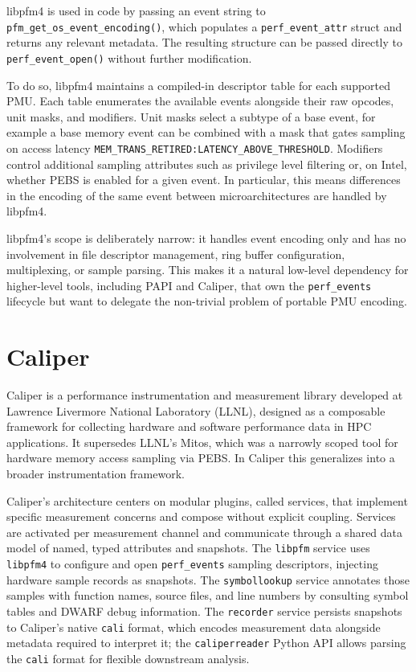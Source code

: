 libpfm4 is used in code by passing an event string to \texttt{pfm\_get\_os\_event\_encoding()}, which populates a \texttt{perf\_event\_attr} struct and returns any relevant metadata. The resulting structure can be passed directly to \texttt{perf\_event\_open()} without further modification.\cite{libpfm4}

To do so, libpfm4 maintains a compiled-in descriptor table for each supported PMU. Each table enumerates the available events alongside their raw opcodes, unit masks, and modifiers. Unit masks select a subtype of a base event, for example a base memory event can be combined with a mask that gates sampling on access latency \texttt{MEM\_TRANS\_RETIRED:LATENCY\_ABOVE\_THRESHOLD}. Modifiers control additional sampling attributes such as privilege level filtering or, on Intel, whether PEBS is enabled for a given event. In particular, this means differences in the encoding of the same event between microarchitectures are handled by libpfm4.\cite{libpfm4}

libpfm4's scope is deliberately narrow: it handles event encoding only and has no involvement in file descriptor management, ring buffer configuration, multiplexing, or sample parsing. This makes it a natural low-level dependency for higher-level tools, including PAPI\cite{PAPI} and Caliper\cite{Boehme2016}, that own the \texttt{perf\_events} lifecycle but want to delegate the non-trivial problem of portable PMU encoding.

\section{Caliper}\label{sec:caliper}
Caliper is a performance instrumentation and measurement library developed at Lawrence Livermore National Laboratory (LLNL)\cite{Boehme2016,CaliperGh}, designed as a composable framework for collecting hardware and software performance data in HPC applications. It supersedes LLNL's Mitos\cite{mitosGh,memaxes}, which was a narrowly scoped tool for hardware memory access sampling via PEBS. In Caliper this generalizes into a broader instrumentation framework.

Caliper's architecture centers on modular plugins, called services, that implement specific measurement concerns and compose without explicit coupling. Services are activated per measurement channel and communicate through a shared data model of named, typed attributes and snapshots. The \texttt{libpfm} service uses \texttt{libpfm4} to configure and open \texttt{perf\_events} sampling descriptors, injecting hardware sample records as snapshots. The \texttt{symbollookup} service annotates those samples with function names, source files, and line numbers by consulting symbol tables and DWARF debug information. The \texttt{recorder} service persists snapshots to Caliper's native \texttt{cali} format, which encodes measurement data alongside metadata required to interpret it; the \texttt{caliperreader} Python API allows parsing the \texttt{cali} format for flexible downstream analysis.\cite{CaliperDocs,CaliperGh}

